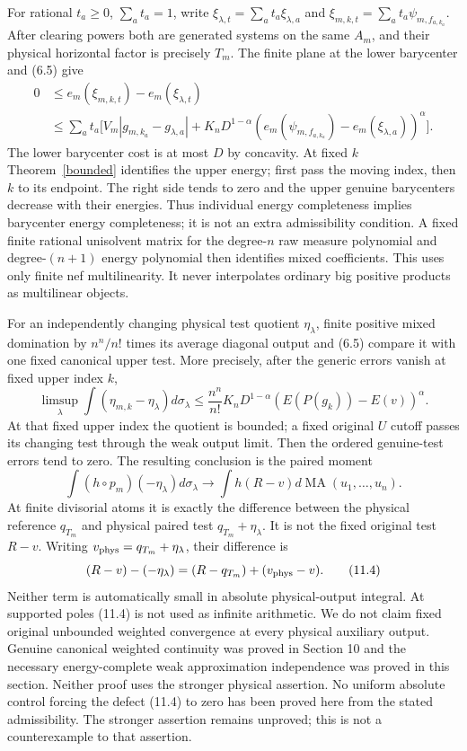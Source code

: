 \documentclass[10pt]{article}
\newcommand{\MA}{\operatorname{MA}}
\begin{document}
For rational $t_a\geq0$, $\sum_a t_a=1$, write
$\xi_{\lambda,t}=\sum_a t_a\xi_{\lambda,a}$ and
$\xi_{m,k,t}=\sum_a t_a\psi_{m,f_{a,k_a}}$. After clearing powers
both are generated systems on the same $A_m$, and their physical
horizontal factor is precisely $T_m$. The finite plane at the lower
barycenter and (6.5) give
\[
\begin{aligned}
0&\leq e_m(\xi_{m,k,t})-e_m(\xi_{\lambda,t})\\
&\leq\sum_a t_a\bigl[ V_m|g_{m,k_a}-g_{\lambda,a}|
 +K_nD^{1-\alpha}
 (e_m(\psi_{m,f_{a,k_a}})-e_m(\xi_{\lambda,a}))^\alpha\bigr].
\end{aligned}
\]
The lower barycenter cost is at most $D$ by concavity. At fixed $k$
Theorem~\ref{bounded} identifies the upper energy; first pass the
moving index, then $k$ to its endpoint. The right side tends to zero
and the upper genuine barycenters decrease with their energies. Thus
individual energy completeness implies barycenter energy completeness;
it is not an extra admissibility condition. A fixed finite rational
unisolvent matrix for the degree-$n$ raw measure polynomial and
degree-$(n+1)$ energy polynomial then identifies mixed coefficients.
This uses only finite nef multilinearity. It never interpolates ordinary
big positive products as multilinear objects.

For an independently changing physical test quotient $\eta_\lambda$,
finite positive mixed domination by $n^n/n!$ times its average diagonal
output and (6.5) compare it with one fixed canonical upper test.
More precisely, after the generic errors vanish at fixed upper index $k$,
\[
\limsup_\lambda\int(\eta_{m,k}-\eta_\lambda)d\sigma_\lambda
\leq\frac{n^n}{n!}K_nD^{1-\alpha}
 (E(P(g_k))-E(v))^\alpha .
\]
At that fixed upper index the quotient is bounded; a fixed original
$U$ cutoff passes its changing test through the weak output limit.
Then the ordered genuine-test errors tend to zero. The resulting
conclusion is the paired moment
\[
 \int(h\circ p_m)(-\eta_\lambda)d\sigma_\lambda
 \longrightarrow\int h(R-v)d\MA(u_1,\ldots,u_n).
 \tag{11.3}
\]
At finite divisorial atoms it is exactly the difference between the
physical reference $q_{T_m}$ and physical paired test
$q_{T_m}+\eta_\lambda$. It is not the fixed original test $R-v$.
Writing $v_{\rm phys}=q_{T_m}+\eta_\lambda$, their difference is
\[
 (R-v)-(-\eta_\lambda)=(R-q_{T_m})+(v_{\rm phys}-v).
 \tag{11.4}
\]
Neither term is automatically small in absolute physical-output
integral. At supported poles (11.4) is not used as infinite arithmetic.
We do not claim fixed original unbounded weighted convergence at every
physical auxiliary output. Genuine canonical weighted continuity was proved in Section 10 and
the necessary energy-complete weak approximation independence was proved
in this section. Neither proof uses the stronger physical assertion.
No uniform absolute control forcing the defect (11.4) to zero has been
proved here from the stated admissibility. The stronger assertion remains
unproved; this is not a counterexample to that assertion.
\end{document}
